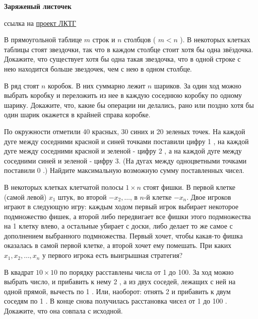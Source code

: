 \centerline{\bf \Huge Заряженый листочек}

\begin{flushright}
        \scriptsize{ссылка на \href{https://turgor.ru/lktg/2019/5-Discharging%20method/index.htm}{проект ЛКТГ}}
\end{flushright}

В прямоугольной таблице $m$ строк и $n$ столбцов ( $m<n$ ). В некоторых клетках таблицы стоят звездочки, так что в каждом столбце стоит хотя бы одна звёздочка. Докажите, что существует хотя бы одна такая звездочка, что в одной строке с нею находится больше звездочек, чем с нею в одном столбце.

В ряд стоят $n$ коробок. В них суммарно лежит $n$ шариков. За один ход можно выбрать коробку и переложить из нее в каждую соседнюю коробку по одному шарику. Докажите, что, какие бы операции ни делались, рано или поздно хотя бы один шарик окажется в крайней справа коробке.

По окружности отметили 40 красных, 30 синих и 20 зеленых точек. На каждой дуге между соседними красной и синей точками поставили цифру 1 , на каждой дуге между соседними красной и зеленой - цифру 2 , а на каждой дуге между соседними синей и зеленой - цифру 3. (На дугах между одноцветными точками поставили 0 .) Найдите максимальную возможную сумму поставленных чисел.

В некоторых клетках клетчатой полосы $1 \times n$ стоят фишки. В первой клетке (самой левой) $x_1$ штук, во второй $-x_2, \ldots$, в $n$-й клетке $-x_n$. Двое игроков играют в следующую игру: каждым ходом первый игрок выбирает некоторое подмножество фишек, а второй либо передвигает все фишки этого подмножества на 1 клетку влево, а остальные убирает с доски, либо делает то же самое с дополнением выбранного подмножества. Первый хочет, чтобы какая-то фишка оказалась в самой первой клетке, а второй хочет ему помешать. При каких $x_1, x_2, \ldots, x_n$ у первого игрока есть выигрышная стратегия?

В квадрат $10 \times 10$ по порядку расставлены числа от 1 до 100. За ход можно выбрать число, и прибавить к нему 2 , а из двух соседей, лежащих с ней на одной прямой, вычесть по 1 . Или, наоборот: отнять 2 и прибавить к двум соседям по 1 . В конце снова получилась расстановка чисел от 1 до 100 . Докажите, что она совпала с исходной.


\newpage

\hspace{3mm}

